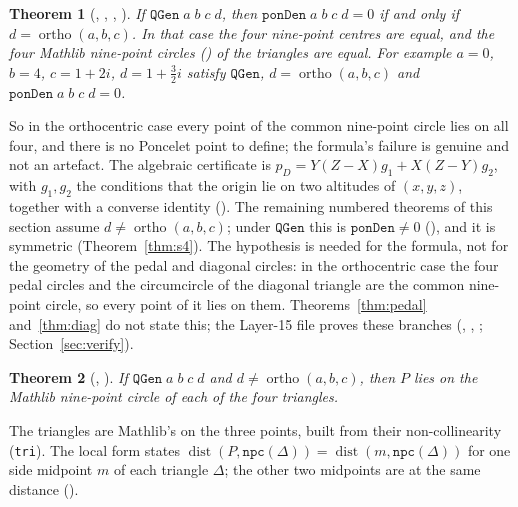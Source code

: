 \documentclass[11pt]{article}
\newtheorem{theorem}{Theorem}
\theoremstyle{definition}
\theoremstyle{remark}
\newcommand{\lean}[1]{\texttt{#1}}
\begin{document}
\begin{theorem}[, , , ]\label{thm:ortho}
If $\lean{QGen}\;a\;b\;c\;d$, then $\lean{ponDen}\;a\;b\;c\;d=0$ if and only if $d=\operatorname{ortho}(a,b,c)$.
In that case the four nine-point centres are equal, and the four Mathlib nine-point circles
() of the triangles are equal. For example $a=0$, $b=4$,
$c=1+2i$, $d=1+\tfrac32i$ satisfy $\lean{QGen}$, $d=\operatorname{ortho}(a,b,c)$ and
$\lean{ponDen}\;a\;b\;c\;d=0$.
\end{theorem}
So in the orthocentric case every point of the common nine-point circle lies on all four, and there is
no Poncelet point to define; the formula's failure is genuine and not an artefact. The algebraic
certificate is $p_D=Y(Z-X)g_1+X(Z-Y)g_2$, with $g_1,g_2$ the conditions that the origin lie on two
altitudes of $(x,y,z)$, together with a converse identity
(). The remaining numbered theorems of this section assume
$d\neq\operatorname{ortho}(a,b,c)$; under $\lean{QGen}$ this is $\lean{ponDen}\neq0$
(), and it is symmetric (Theorem~\ref{thm:s4}). The hypothesis is needed
for the formula, not for the geometry of the pedal and diagonal circles: in the orthocentric case the
four pedal circles and the circumcircle of the diagonal triangle are the common nine-point circle, so
every point of it lies on them. Theorems~\ref{thm:pedal} and~\ref{thm:diag} do not state this; the
Layer-15 file proves these branches (, ,
; Section~\ref{sec:verify}).

\begin{theorem}[, ]\label{thm:nine}
If $\lean{QGen}\;a\;b\;c\;d$ and $d\neq\operatorname{ortho}(a,b,c)$, then $P$ lies on the Mathlib nine-point
circle of each of the four triangles.
\end{theorem}
The triangles are Mathlib's  on the three points, built from their
non-collinearity (\lean{tri}). The local form  states
$\operatorname{dist}(P,\lean{npc}(\Delta))=\operatorname{dist}(m,\lean{npc}(\Delta))$ for one side
midpoint $m$ of each triangle $\Delta$; the other two midpoints are at the same distance
().
\end{document}
